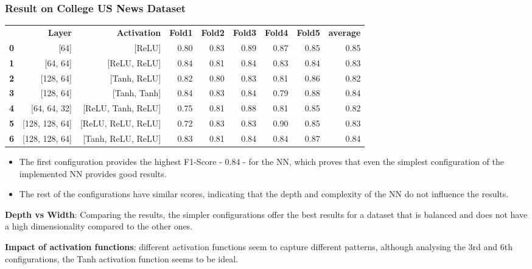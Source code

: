 \documentclass[10pt]{beamer}
\begin{document}
\begin{frame}
\frametitle{Result on College US News Dataset}
\begin{table}
\centering
\tiny
\begin{tabularx}{\textwidth}{rrrrrrrrr}
 & \textbf{Layer} & \textbf{Activation} & \textbf{Fold1} & \textbf{Fold2} & \textbf{Fold3} & \textbf{Fold4} & \textbf{Fold5} & \textbf{average} \\
\textbf{0} & [64] & [ReLU] & 0.80 & 0.83 & 0.89 & 0.87 & 0.85 & 0.85 \\
\textbf{1} & [64, 64] & [ReLU, ReLU] & 0.84 & 0.81 & 0.84 & 0.83 & 0.84 & 0.83 \\
\textbf{2} & [128, 64] & [Tanh, ReLU] & 0.82 & 0.80 & 0.83 & 0.81 & 0.86 & 0.82 \\
\textbf{3} & [128, 64] & [Tanh, Tanh] & 0.84 & 0.83 & 0.84 & 0.79 & 0.88 & 0.84 \\
\textbf{4} & [64, 64, 32] & [ReLU, Tanh, ReLU] & 0.75 & 0.81 & 0.88 & 0.81 & 0.85 & 0.82 \\
\textbf{5} & [128, 128, 64] & [ReLU, ReLU, ReLU] & 0.72 & 0.83 & 0.83 & 0.90 & 0.85 & 0.83 \\
\textbf{6} & [128, 128, 64] & [Tanh, ReLU, ReLU] & 0.83 & 0.81 & 0.84 & 0.84 & 0.87 & 0.84
\end{tabularx}
\end{table}
\scriptsize
\begin{itemize}
\item The first configuration provides the highest F1-Score - 0.84 -  for the NN, which proves that even the simplest configuration of the implemented NN provides good results.
\item The rest of the configurations have similar scores, indicating that the depth and complexity of the NN do not influence the results.
\end{itemize}

\textbf{Depth vs Width}: Comparing the results, the simpler configurations offer the best results for a dataset that is balanced and does not have a high dimensionality compared to the other ones.

\textbf{Impact of activation functions}: different activation functions seem to capture different patterns, although analysing the 3rd and 6th configurations, the Tanh activation function seems to be ideal.
\end{frame}
\end{document}
